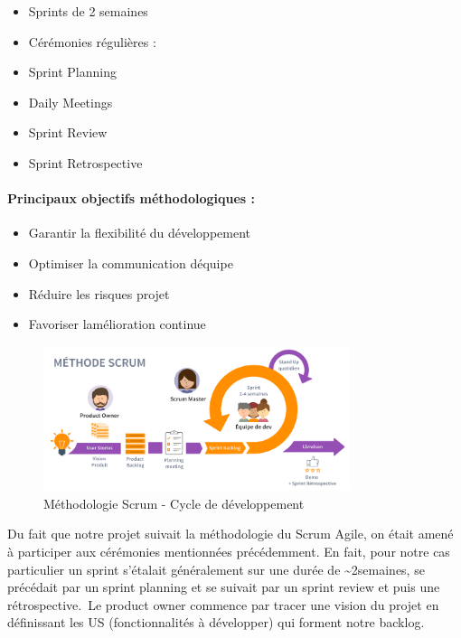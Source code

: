 \documentclass[12pt,a4paper,twoside,openright]{report}
\begin{document}
\begin{itemize}
\item
  Sprints de 2 semaines
\item
  Cérémonies régulières :
\end{itemize}

\begin{itemize}
\item
  Sprint Planning
\item
  Daily Meetings
\item
  Sprint Review
\item
  Sprint Retrospective
\end{itemize}

\hypertarget{principaux-objectifs-muxe9thodologiques}{%
\paragraph{Principaux objectifs méthodologiques
:}\label{principaux-objectifs-muxe9thodologiques}}

\begin{itemize}
\item
  Garantir la flexibilité du développement
\item
  Optimiser la communication d\textquotesingle équipe
\item
  Réduire les risques projet
\item
  Favoriser l\textquotesingle amélioration continue
\end{itemize}

\begin{figure}[htbp]
    \centering
    \includegraphics[width=0.8\textwidth]{latex_media/media/image8.png}
    \caption{Méthodologie Scrum - Cycle de développement}
    \label{fig:cycle-scrum}
\end{figure}

Du fait que notre projet suivait la méthodologie du Scrum Agile, on était amené à participer aux cérémonies mentionnées précédemment. En
fait, pour notre cas particulier un sprint s'étalait généralement sur
une durée de \textasciitilde2semaines, se précédait par un sprint
planning et se suivait par un sprint review et puis une
rétrospective.~Le product owner commence par tracer une vision du projet
en définissant les US (fonctionnalités à développer) qui forment notre
backlog.~~
\end{document}
